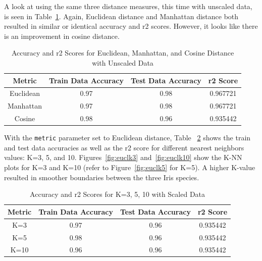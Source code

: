 \documentclass[journal]{IEEEtran}
\begin{document}
A look at using the same three distance measures, this time with unscaled data, is seen in Table~\ref{table:accur5unscaled}. Again, Euclidean distance and Manhattan distance both resulted in similar or identical accuracy and r2 scores. However, it looks like there is an improvement in cosine distance. 

\begin{table}[h!]
\centering
\begin{tabular}{ c | c c c }
Metric & Train Data Accuracy & Test Data Accuracy & r2 Score \\
\hline
Euclidean & 0.97 & 0.98 & 0.967721 \\
Manhattan & 0.97 & 0.98 & 0.967721 \\
Cosine & 0.98 & 0.96 & 0.935442 \\
\end{tabular}
\caption{Accuracy and r2 Scores for Euclidean, Manhattan, and Cosine Distance with Unscaled Data}
\label{table:accur5unscaled}
\end{table}

\newpage 

With the \lstinline{metric} parameter set to Euclidean distance, Table ~\ref{table:accurkscaled} shows the train and test data accuracies as well as the r2 score for different nearest neighbors values: K=3, 5, and 10. Figures~\ref{fig:euclk3} and~\ref{fig:euclk10} show the K-NN plots for K=3 and K=10 (refer to Figure~\ref{fig:euclk5} for K=5). A higher K-value resulted in smoother boundaries between the three Iris species.

\begin{table}[h!]
\centering
\begin{tabular}{ c | c c c }
Metric & Train Data Accuracy & Test Data Accuracy & r2 Score \\
\hline
K=3 & 0.97 & 0.96 & 0.935442 \\
K=5 & 0.98 & 0.96 & 0.935442 \\
K=10 & 0.96 & 0.96 & 0.935442 \\
\end{tabular}
\caption{Accuracy and r2 Scores for K=3, 5, 10 with Scaled Data}
\label{table:accurkscaled}
\end{table}
\end{document}

